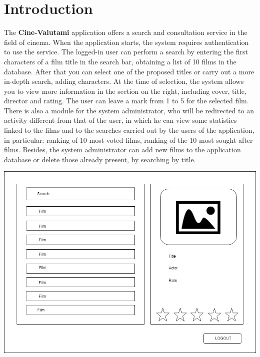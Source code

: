 \documentclass[a4paper, oneside]{article}
\begin{document}
\section{Introduction}
The \textbf{Cine-Valutami} application offers a search and consultation service in the field of cinema. When the application starts, the system requires authentication to use the service.
The logged-in user can perform a search by entering the first characters of a film title in the search bar, obtaining a list of 10 films in the database. After that you can select one of the proposed titles or carry out a more in-depth search, adding characters.
At the time of selection, the system allows you to view more information in the section on the right, including cover, title, director and rating.
The user can leave a mark from 1 to 5 for the selected film.
There is also a module for the system administrator, who will be redirected to an activity different from that of the user, in which he can view some statistics linked to the films and to the searches carried out by the users of the application, in particular: ranking of 10 most voted films, ranking of the 10 most sought after films.
Besides, the system administrator can add new films to the application database or delete those already present, by searching by title.
\begin{minipage}{\linewidth}
\begin{center}
\vspace{8mm}
\includegraphics[width=\textwidth]{./images/diagrams/UserMockup} 
\vspace{3mm}
\label{fig:mockup}
\end{center}
\end{minipage}
\end{document}
